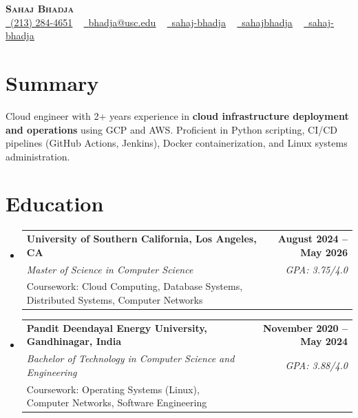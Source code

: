 \documentclass[letterpaper,10pt]{article}
\makeatletter
\newcommand{\resumeEduSubheading}[5]{\vspace{-1pt}\item\begin{tabular*}{1.0\textwidth}[t]{l@{\extracolsep{\fill}}r}\textbf{#1} & \textbf{\small #2} \\\textit{\small #3} & \textit{\small #4} \\\small #5 & \\\end{tabular*}\vspace{-4pt}}
\newcommand{\resumeSubHeadingListStart}{\begin{itemize}[leftmargin=0.0in, label={}]}
\newcommand{\resumeSubHeadingListEnd}{\end{itemize}}
\makeatother
\begin{document}
\begin{center}
{\Huge \scshape \textbf{Sahaj Bhadja}} \\ \vspace{1pt}
\small \href{tel:(213) 284-4651}{\faPhone\ \underline{(213) 284-4651}} ~ \href{mailto:bhadja@usc.edu}{\raisebox{-0.2\height}\faEnvelope\ \underline{bhadja@usc.edu}} ~
\href{https://www.linkedin.com/in/sahaj-bhadja/}{\raisebox{-0.2\height}\faLinkedin\ \underline{sahaj-bhadja}} ~ \href{https://github.com/SAHAJ-BHADJA}{\raisebox{-0.2\height}\faGithub\ \underline{sahajbhadja}} ~
\href{https://sahaj-bhadja.vercel.app/}{\raisebox{-0.2\height}\faGlobe\ \underline{sahaj-bhadja}}
\end{center}
\vspace{-18pt}
\section{Summary}
\begin{itemize}[leftmargin=0.15in, label={}]
\small{\item{Cloud engineer with 2+ years experience in \textbf{cloud infrastructure deployment and operations} using GCP and AWS. Proficient in Python scripting, CI/CD pipelines (GitHub Actions, Jenkins), Docker containerization, and Linux systems administration.}}
\end{itemize}
\vspace{-16pt}
\section{Education}
\resumeSubHeadingListStart
\resumeEduSubheading{University of Southern California, Los Angeles, CA}{August 2024 -- May 2026}{Master of Science in Computer Science}{GPA: 3.75/4.0}{Coursework: Cloud Computing, Database Systems, Distributed Systems, Computer Networks}
\vspace{-9pt}
\resumeEduSubheading{Pandit Deendayal Energy University, Gandhinagar, India}{November 2020 -- May 2024}{Bachelor of Technology in Computer Science and Engineering}{GPA: 3.88/4.0}{Coursework: Operating Systems (Linux), Computer Networks, Software Engineering}
\resumeSubHeadingListEnd
\vspace{-14pt}
\end{document}
